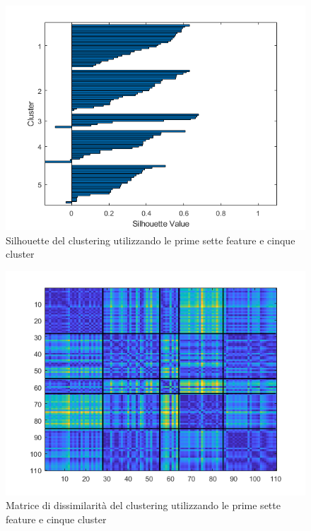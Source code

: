 \documentclass[a4paper,12pt,openany,oneside]{book}
\begin{document}
\begin{figure}[H]
	\centering
	\includegraphics[width=0.8\linewidth]{pics/silhouette.png}
	\caption{Silhouette del clustering utilizzando le prime sette feature e cinque cluster}
	\label{fig:silhouette}
\end{figure}

\begin{figure}[H]
	\centering
	\includegraphics[width=0.8\linewidth]{pics/diss_mat.png}
	\caption{Matrice di dissimilarità del clustering utilizzando le prime sette feature e cinque cluster}
	\label{fig:diss-mat}
\end{figure}
\end{document}
